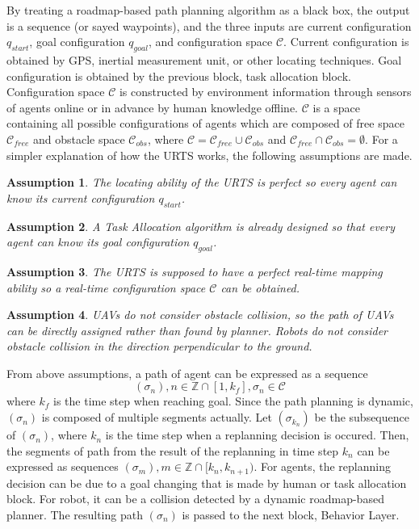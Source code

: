 \documentclass{ieeeaccess}
\newtheorem{assumption}{Assumption}[section]
\begin{document}
By treating a roadmap-based path planning algorithm as a black box, the output is a sequence (or sayed waypoints), and the three inputs are current configuration $q_{start}$, goal configuration $q_{goal}$, and configuration space $\mathcal{C}$. Current configuration is obtained by GPS, inertial measurement unit, or other locating techniques. Goal configuration is obtained by the previous block, task allocation block. Configuration space $\mathcal{C}$ is constructed by environment information through sensors of agents online or in advance by human knowledge offline. $\mathcal{C}$ is a space containing all possible configurations of agents which are composed of free space $\mathcal{C}_{free}$ and obstacle space $\mathcal{C}_{obs}$, where $\mathcal{C}=\mathcal{C}_{free}\cup\mathcal{C}_{obs}$ and $\mathcal{C}_{free}\cap\mathcal{C}_{obs}=\emptyset$. For a simpler explanation of how the URTS works, the following assumptions are made.

\begin{assumption}
    The locating ability of the URTS is perfect so every agent can know its current configuration $q_{start}$.
\end{assumption}
\begin{assumption}
    A Task Allocation algorithm is already designed so that every agent can know its goal configuration $q_{goal}$.
\end{assumption}
\begin{assumption}
    The URTS is supposed to have a perfect real-time mapping ability so a real-time configuration space $\mathcal{C}$ can be obtained.
\end{assumption}
\begin{assumption} \label{asm:collision} %
    UAVs do not consider obstacle collision, so the path of UAVs can be directly assigned rather than found by planner. Robots do not consider obstacle collision in the direction perpendicular to the ground. 
\end{assumption}

From above assumptions, a path of agent can be expressed as a sequence
\begin{equation}
    (\sigma_n), n\in\mathbb{Z}\cap[1,k_f], \sigma_n\in\mathcal{C}
\end{equation}
where $k_f$ is the time step when reaching goal. Since the path planning is dynamic, $(\sigma_n)$ is composed of multiple segments actually. Let $(\sigma_{k_n})$ be the subsequence of $(\sigma_n)$, where $k_n$ is the time step when a replanning decision is occured. Then, the segments of path from the result of the replanning in time step $k_n$ can be expressed as sequences $(\sigma_m), m\in\mathbb{Z}\cap[k_n, k_{n+1})$. For agents, the replanning decision can be due to a goal changing that is made by human or task allocation block. For robot, it can be a collision detected by a dynamic roadmap-based planner. The resulting path $(\sigma_n)$ is passed to the next block, Behavior Layer.
\end{document}
